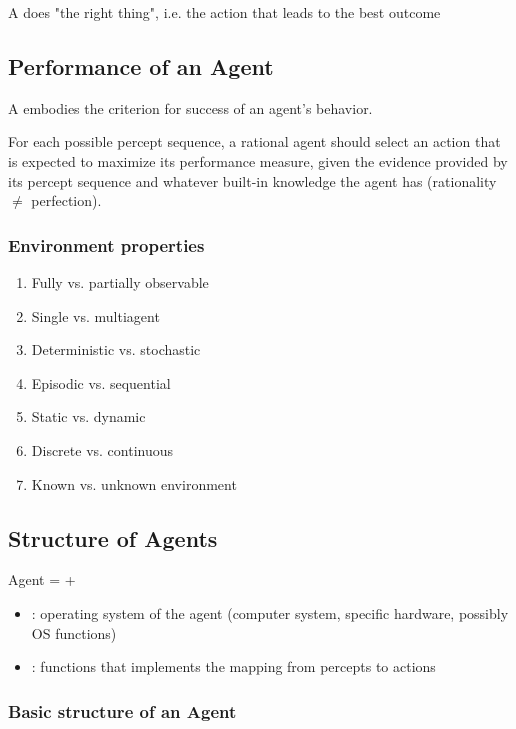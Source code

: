 A  does "the right thing", i.e. the action that leads to the best outcome

\subsection{Performance of an Agent}

A  embodies the criterion for success of an agent's behavior.

For each possible percept sequence, a rational agent should select an action that is expected to maximize its performance measure, given the evidence provided by its percept sequence and whatever built-in knowledge the agent has (rationality $\neq$ perfection).

\subsubsection{Environment properties}

\begin{enumerate}
\item Fully vs. partially observable
\item Single vs. multiagent
\item Deterministic vs. stochastic
\item Episodic vs. sequential
\item Static vs. dynamic
\item Discrete vs. continuous
\item Known vs. unknown environment
\end{enumerate}

\subsection{Structure of Agents}

Agent =  + 

\begin{itemize}
\item {} : operating system of the agent (computer system, specific hardware, possibly OS functions)
\item {} : functions that implements the mapping from percepts to actions
\end{itemize}

\subsubsection{Basic structure of an Agent}

